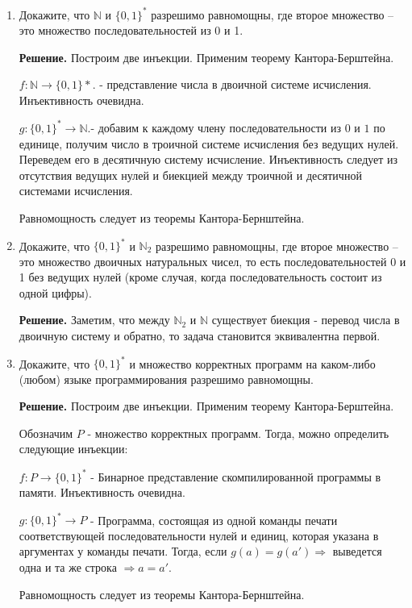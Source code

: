 \begin{enumerate}

\item Докажите, что $\mathbb{N}$ и $\{0,1\}^*$ разрешимо равномощны, где второе множество -- это множество последовательностей из 0 и 1.

\textbf{Решение.} Построим две инъекции. Применим теорему Кантора-Берштейна. 

$f:\mathbb{N} \rightarrow \{0, 1\}*$. - представление числа в двоичной системе исчисления. Инъективность очевидна.

$g:\{0,1\}^* \rightarrow \mathbb{N}$.- добавим к каждому члену последовательности из $0$ и $1$ 
по единице, получим число в троичной системе исчисления без ведущих нулей. Переведем его в 
десятичную систему исчисление. Инъективность следует из отсутствия ведущих нулей и биекцией 
между троичной и десятичной системами исчисления. 

Равномощность следует из теоремы Кантора-Бернштейна.

\item Докажите, что $\{0,1\}^*$ и $\mathbb{N}_2$ разрешимо равномощны, где второе множество -- 
это множество двоичных натуральных чисел,
    то есть последовательностей 0 и 1 без ведущих нулей (кроме случая, когда 
    последовательность состоит из одной цифры).
    
\textbf{Решение.} Заметим, что между $\mathbb{N}_2$ и $\mathbb{N}$ существует биекция - 
перевод числа в двоичную систему и обратно, то задача становится эквивалентна первой.   

\item Докажите, что $\{0,1\}^*$ и множество корректных программ на каком-либо (любом) языке 
программирования разрешимо равномощны.

\textbf{Решение.} Построим две инъекции. Применим теорему Кантора-Берштейна. 

Обозначим $P$ - множество корректных программ. Тогда, можно определить следующие инъекции:

$f:P \rightarrow \{0,1\}^*$ - Бинарное представление скомпилированной программы в памяти. Инъективность очевидна.


$g:\{0,1\}^* \rightarrow P$ - Программа, состоящая из одной команды печати соответствующей 
последовательности нулей и единиц, которая указана в аргументах у команды печати. Тогда, если 
$g(a) = g(a') \Rightarrow $ выведется одна и та же строка $\Rightarrow a = a'$. 

Равномощность следует из теоремы Кантора-Бернштейна.


\end{enumerate}
